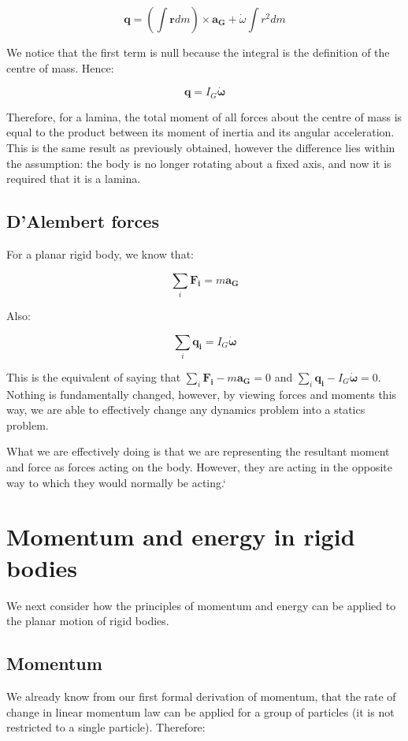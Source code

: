 \documentclass[12pt]{article}
\begin{document}
\[ \mathbf{q} = \left(\int \mathbf{r}dm\right) \times \mathbf{a_G} + \dot{\omega}\int r^2dm \]

We notice that the first term is null because the integral is the definition of the centre of mass. Hence:

\[ \mathbf{q} = I_G\mathbf{\dot{\omega}} \]

Therefore, for a lamina, the total moment of all forces about the centre of mass is equal to the product between its moment of inertia and its angular acceleration. This is the same result as previously obtained, however the difference lies within the assumption: the body is no longer rotating about a fixed axis, and now it is required that it is a lamina.

\subsection{D'Alembert forces}

For a planar rigid body, we know that:

\[ \sum_i \mathbf{F_i} = m\mathbf{a_G} \]

Also:

\[ \sum_i \mathbf{q_i} = I_G \mathbf{\dot{\omega}} \]

This is the equivalent of saying that $\sum_i \mathbf{F_i} - m\mathbf{a_G} = 0$ and $\sum_i \mathbf{q_i} - I_G\dot{\mathbf{\omega}} = 0$. Nothing is fundamentally changed, however, by viewing forces and moments this way, we are able to effectively change any dynamics problem into a statics problem.

What we are effectively doing is that we are representing the resultant moment and force as forces acting on the body. However, they are acting in the opposite way to which they would normally be acting.`

\newpage

\section{Momentum and energy in rigid bodies}

We next consider how the principles of momentum and energy can be applied to the planar motion of rigid bodies.

\subsection{Momentum}

We already know from our first formal derivation of momentum, that the rate of change in linear momentum law can be applied for a group of particles (it is not restricted to a single particle). Therefore:
\end{document}
